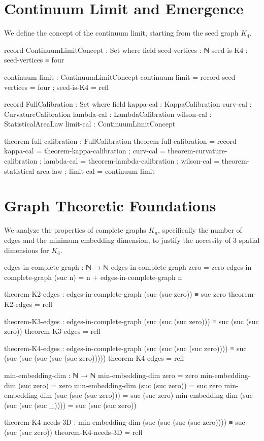 \documentclass[11pt,a4paper]{book}
\begin{document}
\section{Continuum Limit and Emergence}

We define the concept of the continuum limit, starting from the seed graph $K_4$.

\begin{code}
record ContinuumLimitConcept : Set where
  field
    seed-vertices : ℕ
    seed-is-K4 : seed-vertices ≡ four
    
continuum-limit : ContinuumLimitConcept
continuum-limit = record
  { seed-vertices = four
  ; seed-is-K4 = refl
  }

record FullCalibration : Set where
  field
    kappa-cal   : KappaCalibration
    curv-cal    : CurvatureCalibration
    lambda-cal  : LambdaCalibration
    wilson-cal  : StatisticalAreaLaw
    limit-cal   : ContinuumLimitConcept

theorem-full-calibration : FullCalibration
theorem-full-calibration = record
  { kappa-cal   = theorem-kappa-calibration
  ; curv-cal    = theorem-curvature-calibration
  ; lambda-cal  = theorem-lambda-calibration
  ; wilson-cal  = theorem-statistical-area-law
  ; limit-cal   = continuum-limit
  }
\end{code}

\section{Graph Theoretic Foundations}

We analyze the properties of complete graphs $K_n$, specifically the number of edges and the minimum embedding dimension, to justify the necessity of 3 spatial dimensions for $K_4$.

\begin{code}
edges-in-complete-graph : ℕ → ℕ
edges-in-complete-graph zero = zero
edges-in-complete-graph (suc n) = n + edges-in-complete-graph n

theorem-K2-edges : edges-in-complete-graph (suc (suc zero)) ≡ suc zero
theorem-K2-edges = refl

theorem-K3-edges : edges-in-complete-graph (suc (suc (suc zero))) ≡ suc (suc (suc zero))
theorem-K3-edges = refl

theorem-K4-edges : edges-in-complete-graph (suc (suc (suc (suc zero)))) ≡ 
                   suc (suc (suc (suc (suc (suc zero)))))
theorem-K4-edges = refl

min-embedding-dim : ℕ → ℕ
min-embedding-dim zero = zero
min-embedding-dim (suc zero) = zero
min-embedding-dim (suc (suc zero)) = suc zero
min-embedding-dim (suc (suc (suc zero))) = suc (suc zero)
min-embedding-dim (suc (suc (suc (suc _)))) = suc (suc (suc zero))

theorem-K4-needs-3D : min-embedding-dim (suc (suc (suc (suc zero)))) ≡ suc (suc (suc zero))
theorem-K4-needs-3D = refl

\end{code}
\end{document}
